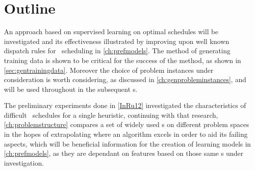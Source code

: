 \section{Outline}
An approach based on supervised learning on optimal schedules will be 
investigated and its effectiveness illustrated by improving upon well known 
dispatch rules for \jsp\ scheduling in \cref{ch:prefmodels}. The method of 
generating training data is shown to be critical for the success of the method, 
as shown in \cref{sec:gentrainingdata}. Moreover the choice of problem 
instances under consideration is worth considering, as discussed in 
\cref{ch:genprobleminstances}, and will be used throughout in the subsequent 
s. 

The preliminary experiments done in \cref{InRu12} investigated the 
characteristics of difficult \jsp\ schedules for a single heuristic, continuing 
with that research, \cref{ch:problemstructure} compares a set of widely used 
\dr s on different problem spaces in the hopes of extrapolating 
where an algorithm excels in order to aid its failing aspects, which will be 
beneficial information for the creation of learning models in 
\cref{ch:prefmodels}, as they are dependant  on features based on those same 
\dr s under investigation.

